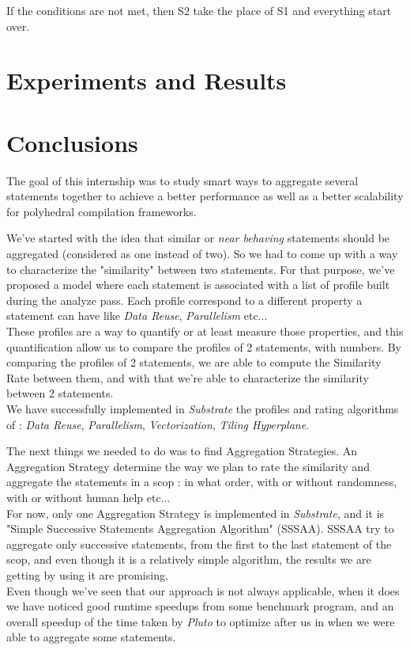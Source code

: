 \documentclass[paper=a4, fontsize=11pt]{scrartcl}
\numberwithin{equation}{section}        %
\numberwithin{figure}{section}          %
\numberwithin{table}{section}               %
\begin{document}
            If the conditions are not met, then S2 take the place of S1 and everything start over.
            

\section{Experiments and Results}

    
\section{Conclusions}
The goal of this internship was to study smart ways to aggregate several statements
together to achieve a better performance as well as a better scalability for polyhedral
compilation frameworks.

\bigskip

We've started with the idea that similar or \textit{near behaving} statements should be
aggregated (considered as one instead of two). So we had to come up with a way to characterize
the "similarity" between two statements. For that purpose, we've proposed a model where
each statement is associated with a list of profile built during the analyze pass.
Each profile correspond to a different property a statement can have like \textit{Data Reuse},
\textit{Parallelism} etc...\\
These profiles are a way to quantify or at least measure those properties, and this quantification
allow us to compare the profiles of 2 statements, with numbers. By comparing the profiles
of 2 statements, we are able to compute the Similarity Rate between them, and with that we're
able to characterize the similarity between 2 statements.\\
We have successfully implemented in \textit{Substrate} the profiles and rating algorithms of :
\textit{Data Reuse}, \textit{Parallelism}, \textit{Vectorization}, \textit{Tiling Hyperplane}.

The next things we needed to do was to find Aggregation Strategies. An Aggregation Strategy
determine the way we plan to rate the similarity and aggregate the statements in a scop : in what
order, with or without randomness, with or without human help etc...\\
For now, only one Aggregation Strategy is implemented in \textit{Substrate},
and it is "Simple Successive Statements Aggregation Algorithm" (SSSAA).
SSSAA try to aggregate only successive statements, from the first to the last
statement of the scop, and even though it is a relatively simple algorithm, the results we
are getting by using it are promising.\\
Even though we've seen that our approach is not always applicable, when it does
we have noticed good runtime speedups from some benchmark program, and an overall
speedup of the time taken by \textit{Pluto} to optimize after us in when we were able to
aggregate some statements.
\end{document}

